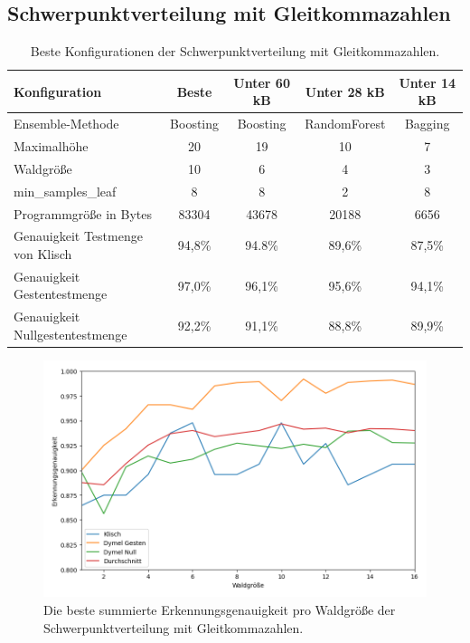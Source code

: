 \subsection{Schwerpunktverteilung mit Gleitkommazahlen}
\begin{table}[h!]
    \hspace{-0.5cm}
    \begin{tabular}{ | l | c | c | c | c |}
        \hline
        Konfiguration & Beste & Unter 60 kB & Unter 28 kB & Unter 14 kB \\\hline
        Ensemble-Methode & Boosting & Boosting & RandomForest & Bagging  \\\hline
        Maximalhöhe & 20 & 19 & 10 & 7 \\\hline
        Waldgröße & 10 & 6 & 4 & 3 \\\hline
        min\_samples\_leaf & 8 & 8 & 2 & 8 \\\hline
        Programmgröße in Bytes & 83304 & 43678 & 20188 & 6656 \\\hline
        Genauigkeit Testmenge von Klisch & 94,8\% & 94.8\% & 89,6\% & 87,5\% \\\hline
        Genauigkeit Gestentestmenge & 97,0\% & 96,1\% & 95,6\% & 94,1\% \\\hline
        Genauigkeit Nullgestentestmenge & 92,2\% & 91,1\% & 88,8\% & 89,9\% \\\hline
    \end{tabular}
    \caption{Beste Konfigurationen der Schwerpunktverteilung mit Gleitkommazahlen.}
    \label{tab:schwerpunktverteilung_float}
\end{table}
\begin{figure}[h!]
    \centering
    \includegraphics[width=\linewidth]{images/cocd_float_acc_per_size.png}
    \caption{Die beste summierte Erkennungsgenauigkeit pro Waldgröße der Schwerpunktverteilung mit Gleitkommazahlen.}
    \label{fig:cocd_float_per_forest_size}
\end{figure}
